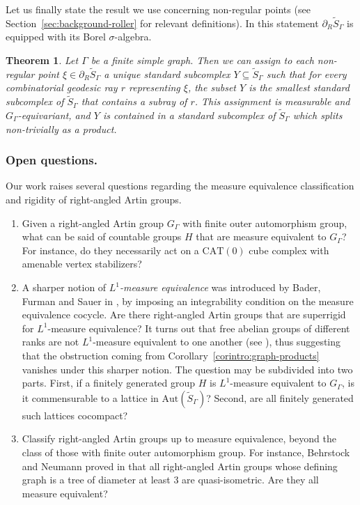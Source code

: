 \documentclass[11pt]{article}
\numberwithin{equation}{section}
\theoremstyle{plain}
\newtheorem{theointro}{Theorem}
\theoremstyle{definition}
\newcommand{\Aut}{\mathrm{Aut}}
\begin{document}
Let us finally state the result we use concerning non-regular points (see Section~\ref{sec:background-roller} for relevant definitions). In this statement $\partial_R\widetilde{S}_\Gamma$ is equipped with its Borel $\sigma$-algebra.

\begin{theointro}\label{theointro:roller}
Let $\Gamma$ be a finite simple graph. Then we can assign to each non-regular point $\xi\in\partial_R\widetilde{S}_\Gamma$ a unique standard subcomplex $Y\subseteq\widetilde{S}_\Gamma$ such that for every combinatorial geodesic ray $r$ representing $\xi$, the subset $Y$ is the smallest standard subcomplex of $\widetilde{S}_\Gamma$ that contains a subray of $r$. This assignment is measurable and $G_\Gamma$-equivariant, and $Y$ is contained in a standard subcomplex of $\widetilde{S}_\Gamma$ which splits non-trivially as a product.
\end{theointro}

\subsubsection*{Open questions.} Our work raises several questions regarding the measure equivalence classification and rigidity of right-angled Artin groups.
\begin{enumerate}
\item Given a right-angled Artin group $G_\Gamma$ with finite outer automorphism group, what can be said of countable groups $H$ that are measure equivalent to $G_\Gamma$? For instance, do they necessarily act on a $\mathrm{CAT}(0)$ cube complex with amenable vertex stabilizers?
\item A sharper notion of \emph{$L^1$-measure equivalence} was introduced by Bader, Furman and Sauer in \cite{BFS}, by imposing an integrability condition on the measure equivalence cocycle. Are there right-angled Artin groups that are superrigid for $L^1$-measure equivalence? It turns out that free abelian groups of different ranks are not $L^1$-measure equivalent to one another (see \cite{Aus}), thus suggesting that the obstruction coming from Corollary~\ref{corintro:graph-products} vanishes under this sharper notion. The question may be subdivided into two parts. First, if a finitely generated group $H$ is $L^1$-measure equivalent to $G_\Gamma$, is it commensurable to a lattice in $\Aut(\widetilde{S}_\Gamma)$? Second, are all finitely generated such lattices cocompact?
\item Classify right-angled Artin groups up to measure equivalence, beyond the class of those with finite outer automorphism group. For instance, Behrstock and Neumann proved in \cite{behrstock2008quasi} that all right-angled Artin groups whose defining graph is a tree of diameter at least $3$ are quasi-isometric. Are they all measure equivalent?
\end{enumerate}
\end{document}
